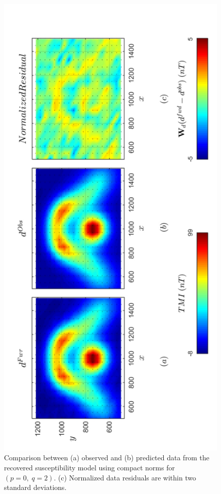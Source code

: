 \begin{figure}[h!]
\centering
\includegraphics[scale=0.52, angle =270]{3D_Inv_l0l2_pred_INDUCED.pdf}
\caption{ Comparison between (a) observed and (b) predicted data from the recovered susceptibility model using compact norms for  $(p = 0,\; q = 2)$. (c) Normalized data residuals are within two standard deviations.}
\label{fig:3D_Inv_l0l2_pred_INDUCED}
\end{figure}

